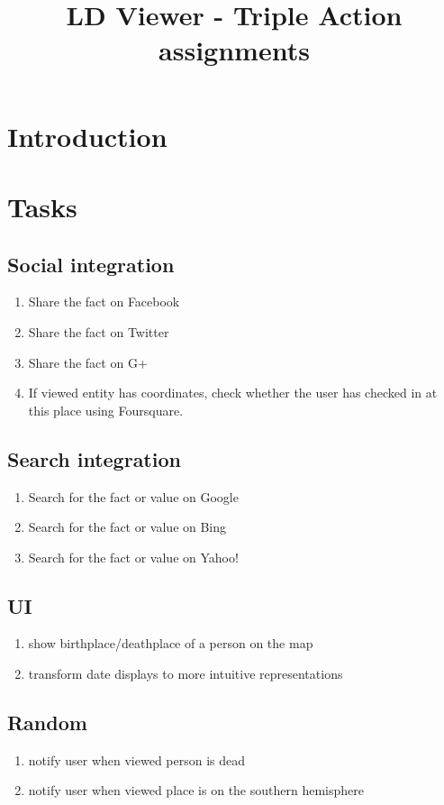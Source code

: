 \documentclass{article}
\begin{document}
\title{LD Viewer - Triple Action assignments}
\date{}
\maketitle

\section{Introduction}

\section{Tasks}
\subsection{Social integration}
\begin{enumerate}
\item Share the fact on Facebook
\item Share the fact on Twitter
\item Share the fact on G+
\item If viewed entity has coordinates, check whether the user has checked in at this place using Foursquare.
\end{enumerate}

\subsection{Search integration}
\begin{enumerate}
\item Search for the fact or value on Google
\item Search for the fact or value on Bing
\item Search for the fact or value on Yahoo!
\end{enumerate}

\subsection{UI}
\begin{enumerate}
\item show birthplace/deathplace of a person on the map
\item transform date displays to more intuitive representations
\end{enumerate}

\subsection{Random}
\begin{enumerate}
\item notify user when viewed person is dead
\item notify user when viewed place is on the southern hemisphere
\end{enumerate}
\end{document}
